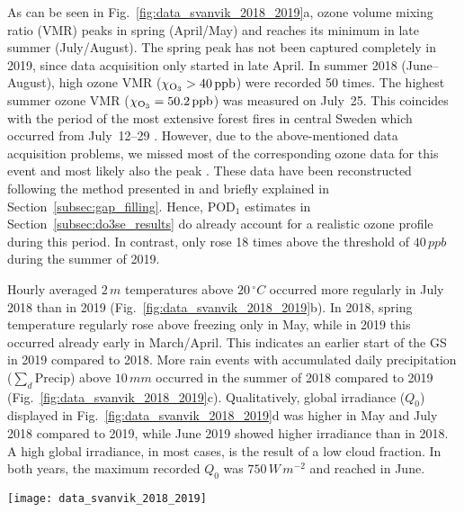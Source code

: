 \documentclass[bg, manuscript]{copernicus}
\begin{document}
As can be seen in Fig.~\ref{fig:data_svanvik_2018_2019}a, ozone volume mixing ratio (VMR)  peaks in spring (April/May) and reaches its minimum in late summer (July/August). The spring peak has not been captured completely in 2019, since data acquisition only started in late April. In summer 2018 (June--August), high ozone VMR ($\chem{\chi_{O_3}} > 40\,\unit{ppb}$) were recorded 50 times. The highest summer ozone VMR ($\chem{\chi_{O_3}} = 50.2\,\unit{ppb}$) was measured on July~25. This coincides with the period of the most extensive forest fires in central Sweden which occurred from July~12--29 \citep{SOU2019}. However, due to the above-mentioned data acquisition problems, we missed most of the corresponding ozone data for this event and most likely also the peak . These data have been reconstructed following the method presented in \citet{ACP:Falk2021} and briefly explained in Section~\ref{subsec:gap_filling}. Hence, $\mathrm{POD_1}$ estimates in Section~\ref{subsec:do3se_results} do already account for a realistic ozone profile during this period. In contrast,  only rose 18 times above the threshold of $40\,\unit{ppb}$ during the summer of 2019. 

Hourly averaged $2\,\unit{m}$ temperatures above $20\,\unit{^\circ C}$ occurred more regularly in July 2018 than in 2019 (Fig.~\ref{fig:data_svanvik_2018_2019}b). In 2018, spring temperature regularly rose above freezing only in May, while in 2019 this occurred already early in March/April. This indicates an earlier start of the GS in 2019 compared to 2018.
More rain events with accumulated daily precipitation ($\sum_d \mathrm{Precip}$) above $10\,\unit{mm}$ occurred in the summer of 2018 compared to 2019 (Fig.~\ref{fig:data_svanvik_2018_2019}c).
Qualitatively, global irradiance ($Q_0$) displayed in Fig.~\ref{fig:data_svanvik_2018_2019}d was higher in May and July 2018 compared to 2019, while June 2019 showed higher irradiance than in 2018. A high global irradiance, in most cases, is the result of a low cloud fraction. In both years, the maximum recorded $Q_0$ was $750\,\unit{W\,m^{-2}}$ and reached in June.

\begin{figure*}[t]
  \texttt{[image: data\_svanvik\_2018\_2019]}
  \caption{Observational data from atmospheric monitoring at Svanhovd in 2018 and 2019. The hatched areas indicate periods without ozone monitoring data. (a) Hourly averaged ozone VMR; (b) hourly averaged temperature; (c) daily accumulated precipitation; (d) hourly averaged global irradiance.}
  \label{fig:data_svanvik_2018_2019}
\end{figure*}
\end{document}
